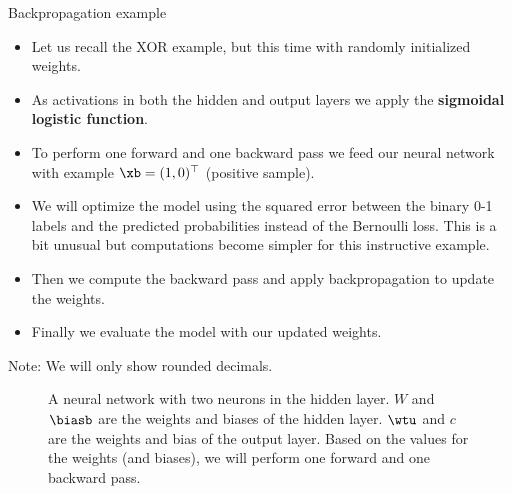 \begin{vbframe}{Backpropagation example}
  \begin{itemize}
    \item Let us recall the XOR example, but this time with randomly initialized weights.
    \item As activations in both the hidden and output layers we apply the \textbf{sigmoidal logistic function}.
    \item To perform one forward and one backward pass we feed our neural network with example $\xb = (1,0)^\top$ (positive sample).
    \item We will optimize the model using the squared error between the binary 0-1 labels and the predicted probabilities instead of the Bernoulli loss. This is
      a bit unusual but computations become simpler for this instructive example.
    \item Then we compute the backward pass and apply backpropagation to update the weights.
    \item Finally we evaluate the model with our updated weights.
  \end{itemize}

\begin{footnotesize}
  Note: We will only show rounded decimals. 
\end{footnotesize}

\framebreak

  \begin{figure}
    \centering
      \caption{A neural network with two neurons in the hidden layer. $W$ and $\biasb$ are the weights and biases of the hidden layer. $\wtu$ and $c$ are the weights and bias of the output layer. Based on the values for the weights (and biases), we will perform one forward and one backward pass.}
  \end{figure}

\framebreak

    \end{vbframe} 

